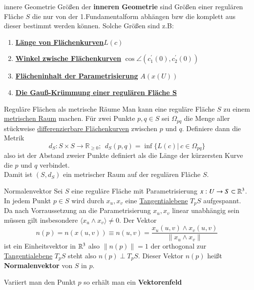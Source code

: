 \begin{titleDef}{innere Geometrie}
\label{innerGeo}
Größen der \textbf{inneren Geometrie} sind Größen einer regulären Fläche $S$ die nur von der 1.Fundamentalform abhängen bzw die komplett aus dieser bestimmt werden können. Solche Größen sind z.B:
\begin{enumerate}[label=(\alph*)]
	\item \textbf{\hyperref[laengeFlaechenkurve]{Länge von Flächenkurven}}$L(c)$
	\item \textbf{\hyperref[winkelFlaechenkurve]{Winkel zwische Flächenkurven}} $\cos\angle(c_1^\prime(0),c_2^\prime(0))$
	\item \textbf{\hyperref[inhaltPara]{Flächeninhalt der Parametrisierung}} $A(x(U))$
	\item \textbf{\hyperref[gausskruemmung]{Die Gauß-Krümmung einer regulären Fläche S}}
\end{enumerate}
\end{titleDef}

\begin{titleDef}{Reguläre Flächen als metrische Räume}
Man kann eine reguläre Fläche $S$ zu einem \hyperref[MetrischerRaum]{metrischen Raum} machen. Für zwei Punkte $p,q\in S$ sei $\Omega_{pq}$ die Menge aller stückweise \hyperref[diffFlaechenkurve]{differenzierbare Flächenkurven} zwischen $p$ und $q$.
Definiere dann die Metrik
$$d_S:S\times S\to \mathbb{R}_{\geq0};\:\: d_S(p,q)=\inf\{L(c)|\ c\in\Omega_{pq}\}$$ 
also ist der Abstand zweier Punkte definiert als die Länge der kürzersten Kurve die $p$ und $q$ verbindet.\\
Damit ist $(S,d_S)$ ein metrischer Raum auf der regulären Fläche $S$.
\end{titleDef}

\begin{titleDef}{Normalenvektor}
\label{normalenvektor}
\label{vektorenfeld}
Sei $S$ eine reguläre Fläche mit Parametrisierung $x:U\to S\subset\mathbb{R}^3$. In jedem Punkt $p\in S$ wird durch $x_u,x_v$ eine \hyperref[tangentialebene]{Tangentialebene} $T_pS$ aufgespannt. Da nach Vorraussetzung an die Parametrisierung $x_u,x_v$ linear unabhängig sein müssen gilt insbesondere $\langle x_u\wedge x_v\rangle\neq0$. Der Vektor
$$n(p)=n(x(u,v))\equiv n(u,v)=\frac{x_u(u,v)\wedge x_v(u,v)}{\lVert x_u\wedge x_v\rVert}$$
ist ein Einheitsvektor in $\mathbb{R}^3$ also $\lVert n(p)\rVert=1$ der orthogonal zur \hyperref[tangentialebene]{Tangentialebene} $T_pS$ steht also $n(p)\perp T_pS$. Dieser Vektor $n(p)$ heißt \textbf{Normalenvektor} von $S$ in $p$.\par
Variiert man den Punkt $p$ so erhält man ein \textbf{Vektorenfeld}
\end{titleDef}

